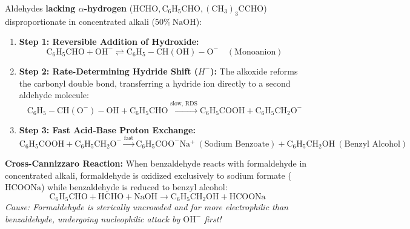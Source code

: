 \documentclass[10pt,a4paper]{article}
\begin{document}
\begin{formulabox}
Aldehydes \textbf{lacking $\alpha$-hydrogen} ($\mathrm{HCHO, C_6H_5CHO, (CH_3)_3CCHO}$) disproportionate in concentrated alkali ($50\%\ \mathrm{NaOH}$):
\begin{enumerate}[leftmargin=*]
  \item \textbf{Step 1: Reversible Addition of Hydroxide:}
  \begin{equation}
    \mathrm{C_6H_5CHO} + \mathrm{OH^-} \rightleftharpoons \mathrm{C_6H_5-CH(OH)-O^-} \quad (\text{Monoanion})
  \end{equation}
  \item \textbf{Step 2: Rate-Determining Hydride Shift ($H^-$):}
  The alkoxide reforms the carbonyl double bond, transferring a hydride ion directly to a second aldehyde molecule:
  \begin{equation}
    \mathrm{C_6H_5-CH(O^-)-OH} + \mathrm{C_6H_5CHO} \xrightarrow{\text{slow, RDS}} \mathrm{C_6H_5COOH} + \mathrm{C_6H_5CH_2O^-}
  \end{equation}
  \item \textbf{Step 3: Fast Acid-Base Proton Exchange:}
  \begin{equation}
    \mathrm{C_6H_5COOH} + \mathrm{C_6H_5CH_2O^-} \xrightarrow{\text{fast}} \mathbf{\mathrm{C_6H_5COO^-Na^+}} \ (\text{Sodium Benzoate}) + \mathbf{\mathrm{C_6H_5CH_2OH}} \ (\text{Benzyl Alcohol})
  \end{equation}
\end{enumerate}
\textbf{Cross-Cannizzaro Reaction:} When benzaldehyde reacts with formaldehyde in concentrated alkali, formaldehyde is oxidized exclusively to sodium formate ($\mathrm{HCOONa}$) while benzaldehyde is reduced to benzyl alcohol:
\begin{equation}
  \mathrm{C_6H_5CHO} + \mathrm{HCHO} + \mathrm{NaOH} \longrightarrow \mathbf{\mathrm{C_6H_5CH_2OH}} + \mathbf{\mathrm{HCOONa}}
\end{equation}
\textit{Cause: Formaldehyde is sterically uncrowded and far more electrophilic than benzaldehyde, undergoing nucleophilic attack by $\mathrm{OH^-}$ first!}
\end{formulabox}
\end{document}
